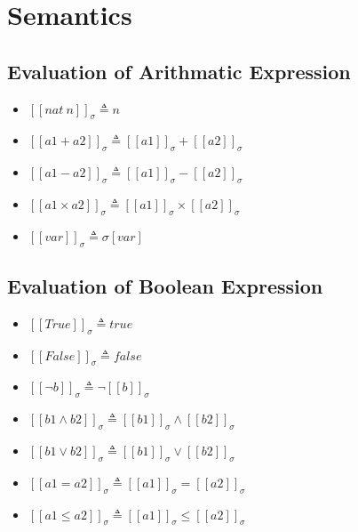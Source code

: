 \documentclass[12pt, fleqn]{article}
\begin{document}

\section{Semantics}

\subsection{Evaluation of Arithmatic Expression}
\begin{itemize}
\item %
  $[[nat \ n]]_\sigma \triangleq n$
\item %
  $[[a1 + a2]]_\sigma \triangleq [[a1]]_\sigma + [[a2]]_\sigma$
\item %
  $[[a1 - a2]]_\sigma \triangleq [[a1]]_\sigma - [[a2]]_\sigma$
\item %
  $[[a1 \times a2]]_\sigma \triangleq [[a1]]_\sigma \times [[a2]]_\sigma$
\item %
  $[[var]]_\sigma \triangleq \sigma[var]$
\end{itemize}


\subsection{Evaluation of Boolean Expression}
\begin{itemize}
\item %
  $[[True]]_\sigma \triangleq true$
\item %
  $[[False]]_\sigma \triangleq false$
\item %
  $[[\lnot b]]_\sigma \triangleq \lnot [[b]]_\sigma$
\item %
  $[[b1 \land b2]]_\sigma \triangleq [[b1]]_\sigma \land [[b2]]_\sigma$
\item %
  $[[b1 \lor b2]]_\sigma \triangleq [[b1]]_\sigma \lor [[b2]]_\sigma$
\item %
  $[[a1 = a2]]_\sigma \triangleq [[a1]]_\sigma = [[a2]]_\sigma$
\item %
  $[[a1 \le a2]]_\sigma \triangleq [[a1]]_\sigma \le [[a2]]_\sigma$
\end{itemize}
\end{document}
